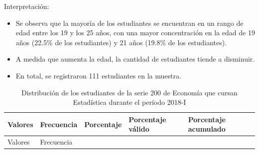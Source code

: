 \documentclass[
  jou,
  floatsintext,
  longtable,
  a4paper,
  nolmodern,
  notxfonts,
  notimes,
  12pt,
  colorlinks=true,linkcolor=blue,citecolor=blue,urlcolor=blue]{apa7}
\providecommand{\tightlist}{%
  \setlength{\itemsep}{0pt}\setlength{\parskip}{0pt}}
\begin{document}
Interpretación:

\begin{itemize}
\tightlist
\item
  Se observa que la mayoría de los estudiantes se encuentran en un rango
  de edad entre los 19 y los 25 años, con una mayor concentración en la
  edad de 19 años (22.5\% de los estudiantes) y 21 años (19.8\% de los
  estudiantes).
\item
  A medida que aumenta la edad, la cantidad de estudiantes tiende a
  disminuir.
\item
  En total, se registraron 111 estudiantes en la muestra.
\end{itemize}

\begin{ThreePartTable}

\begin{longtable}[]{@{}
  >{\centering\arraybackslash}p{}
  >{\centering\arraybackslash}p{}
  >{\centering\arraybackslash}p{}
  >{\centering\arraybackslash}p{}
  >{\centering\arraybackslash}p{}@{}}
\caption{Distribución de los estudiantes de la serie 200 de Economía que
cursan Estadística durante el período
2018-I}\label{tbl-2}\tabularnewline
\toprule\noalign{}
\begin{minipage}[b]{\linewidth}\centering
Valores
\end{minipage} & \begin{minipage}[b]{\linewidth}\centering
Frecuencia
\end{minipage} & \begin{minipage}[b]{\linewidth}\centering
Porcentaje
\end{minipage} & \begin{minipage}[b]{\linewidth}\centering
Porcentaje válido
\end{minipage} & \begin{minipage}[b]{\linewidth}\centering
Porcentaje acumulado
\end{minipage} \\
\midrule\noalign{}
\endfirsthead
\toprule\noalign{}
\begin{minipage}[b]{\linewidth}\centering
Valores
\end{minipage} & \begin{minipage}[b]{\linewidth}\centering
Frecuencia
\end{minipage} & \begin{minipage}[b]{\linewidth}\centering

\end{minipage}
\end{longtable}
\end{ThreePartTable}
\end{document}

